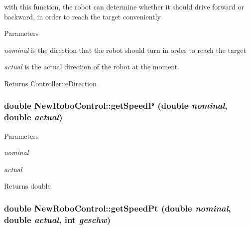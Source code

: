 with this function, the robot can determine whether it should drive forward or backward, in order to reach the target conveniently 


\begin{DoxyParams}{Parameters}
\item[{\em nominal}]is the direction that the robot should turn in order to reach the target \item[{\em actual}]is the actual direction of the robot at the moment. \end{DoxyParams}
\begin{DoxyReturn}{Returns}
Controller::eDirection 
\end{DoxyReturn}
\hypertarget{classNewRoboControl_ab2f2407b40c535ed734049e8e1ed71e6}{
\subsubsection[{getSpeedP}]{\setlength{\rightskip}{0pt plus 5cm}double NewRoboControl::getSpeedP (double {\em nominal}, \/  double {\em actual})}}
\label{classNewRoboControl_ab2f2407b40c535ed734049e8e1ed71e6}

\begin{DoxyParams}{Parameters}
\item[{\em nominal}]\item[{\em actual}]\end{DoxyParams}
\begin{DoxyReturn}{Returns}
double 
\end{DoxyReturn}
\hypertarget{classNewRoboControl_ac1f5cb8932193d5e8315bb19aeddb3fa}{
\subsubsection[{getSpeedPt}]{\setlength{\rightskip}{0pt plus 5cm}double NewRoboControl::getSpeedPt (double {\em nominal}, \/  double {\em actual}, \/  int {\em geschw})}}
\label{classNewRoboControl_ac1f5cb8932193d5e8315bb19aeddb3fa}

